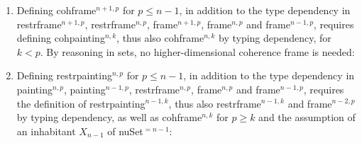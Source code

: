 \documentclass[a4paper,english,cleveref,autoref,thm-restate]{article}
\begin{document}
\begin{enumerate}
\item Defining cohframe$^{n+1,p}$ for $p\leq n-1$, in addition to the
  type dependency in restrframe$^{n+1,p}$, restrframe$^{n,p}$,
  frame$^{n+1,p}$, frame$^{n,p}$ and frame$^{n-1,p}$, requires defining
  cohpainting$^{n,k}$, thus also cohframe$^{n,k}$ by typing
  dependency, for $k < p$. By reasoning in sets, no higher-dimensional
  coherence frame is needed:
\begin{center}
\end{center}
\item Defining restrpainting$^{n,p}$ for $p\leq n-1$, in addition to
  the type dependency in painting$^{n,p}$, painting$^{n-1,p}$, restrframe$^{n,p}$, frame$^{n,p}$ and
  frame$^{n-1,p}$, requires the definition of restrpainting$^{n-1,k}$,
  thus also restrframe$^{n-1,k}$ and frame$^{n-2,p}$ by typing
  dependency, as well as cohframe$^{n,k}$ for $p \geq k$ and the
  assumption of an inhabitant $X_{n-1}$ of nuSet$^{=n-1}$:
\begin{center}
\end{center}


\end{enumerate}
\end{document}
